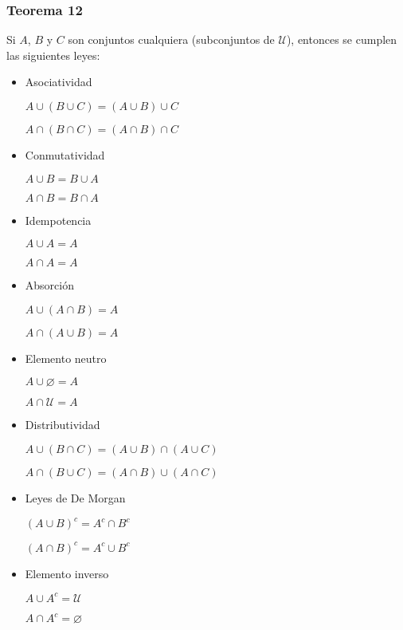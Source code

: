 \begin{multicols}{2}
    \subsubsection*{Teorema 12}
    Si $A$, $B$ y $C$ son conjuntos cualquiera (subconjuntos de $\mathcal{U}$), entonces se cumplen las siguientes leyes:    
    \begin{itemize}
        \item Asociatividad
        
        $A \cup (B \cup C) = (A \cup B) \cup C$
    
        $A \cap (B \cap C) = (A \cap B) \cap C$
    
        \item Conmutatividad
        
        $A \cup B = B \cup A$
    
        $A \cap B = B \cap A$
    
        \item Idempotencia
        
        $A \cup A = A$
    
        $A \cap A = A$
    
        \item Absorción
        
        $A \cup (A \cap B) = A$
    
        $A \cap (A \cup B) = A$
    
        \item Elemento neutro
        
        $A \cup \varnothing = A$
    
        $A \cap \mathcal{U} = A$
    
        \item Distributividad
        
        $A \cup (B \cap C) = (A \cup B) \cap (A \cup C)$
    
        $A \cap (B \cup C) = (A \cap B) \cup (A \cap C)$
    
        \item Leyes de De Morgan
        
        $(A \cup B)^c = A^c \cap B^c$
    
        $(A \cap B)^c = A^c \cup B^c$
    
        \item Elemento inverso
        
        $A \cup A^c = \mathcal{U}$
    
        $A \cap A^c = \varnothing$
    

\end{itemize}
\end{multicols}
